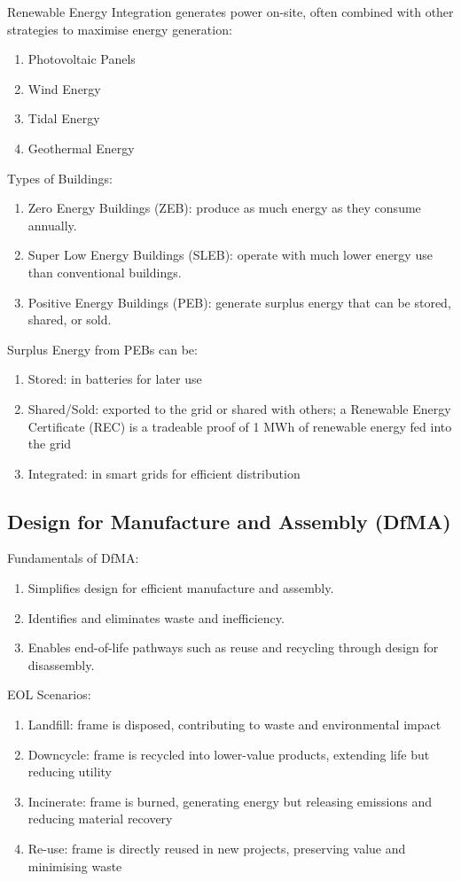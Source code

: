 \documentclass[12pt, a4paper]{article}
\begin{document}
\begin{multicols*}{3}
{Renewable Energy Integration} generates power on-site, often combined with other strategies to maximise energy generation:
\begin{enumerate}[\roman*.]
  \item Photovoltaic Panels 
  \item Wind Energy
  \item Tidal Energy 
  \item Geothermal Energy
\end{enumerate}

Types of Buildings:
\begin{enumerate}[\roman*.]
  \item Zero Energy Buildings (ZEB): produce as much energy as they consume annually.
  \item Super Low Energy Buildings (SLEB): operate with much lower energy use than conventional buildings.
  \item Positive Energy Buildings (PEB): generate surplus energy that can be stored, shared, or sold.
\end{enumerate}

Surplus Energy from PEBs can be:
\begin{enumerate}[\roman*.]
  \item Stored: in batteries for later use 
  \item Shared/Sold: exported to the grid or shared with others; a Renewable Energy Certificate (REC) is a tradeable proof of 1 MWh of renewable energy fed into the grid 
  \item Integrated: in smart grids for efficient distribution
\end{enumerate}

\subsection{Design for Manufacture and Assembly (DfMA)}
Fundamentals of DfMA:
\begin{enumerate}[\roman*.]
  \item Simplifies design for efficient manufacture and assembly.
  \item Identifies and eliminates waste and inefficiency.
  \item Enables end-of-life pathways such as reuse and recycling through design for disassembly.
\end{enumerate}

EOL Scenarios:
\begin{enumerate}[\roman*.]
  \item Landfill: frame is disposed, contributing to waste and environmental impact 
  \item Downcycle: frame is recycled into lower-value products, extending life but reducing utility 
  \item Incinerate: frame is burned, generating energy but releasing emissions and reducing material recovery 
  \item Re-use: frame is directly reused in new projects, preserving value and minimising waste
\end{enumerate}


\end{multicols*}
\end{document}
